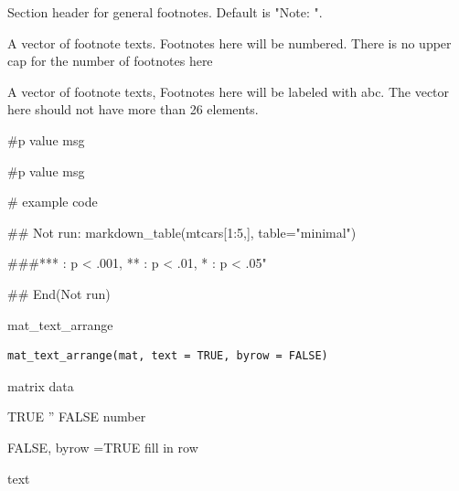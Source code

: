 \documentclass[a4paper]{book}
\begin{document}
\begin{Arguments}
\begin{ldescription}
\item[\code{general\_title}] Section header for general footnotes. Default is "Note: ".

\item[\code{number}] A vector of footnote texts. Footnotes here will be numbered. There is no upper cap for the number of footnotes here

\item[\code{alphabet}] A vector of footnote texts, Footnotes here will be labeled with abc. The vector here should not have more than 26 elements.

\item[\code{catout}] \#p value msg

\item[\code{general}] \#p value msg
\end{ldescription}
\end{Arguments}
%
\begin{Examples}
\begin{ExampleCode}
# example code

  \#\# Not run: 
  markdown_table(mtcars[1:5,], table="minimal")

  ###*** : p < .001, ** : p < .01, * : p < .05"
  
## End(Not run)
\end{ExampleCode}
\end{Examples}
%
\begin{Description}
mat\_text\_arrange
\end{Description}
%
\begin{Usage}
\begin{verbatim}
mat_text_arrange(mat, text = TRUE, byrow = FALSE)
\end{verbatim}
\end{Usage}
%
\begin{Arguments}
\begin{ldescription}
\item[\code{mat}] matrix data

\item[\code{text}] TRUE '' FALSE number

\item[\code{byrow}] FALSE, byrow =TRUE fill in row
\end{ldescription}
\end{Arguments}
%
\begin{Value}
text
\end{Value}
\end{document}
